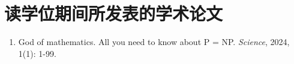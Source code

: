 \chapter{读学位期间所发表的学术论文}

\begin{enumerate}
    \item God of mathematics. All you need to know about P = NP. \textit{Science}, 2024, 1(1): 1-99.
\end{enumerate}

